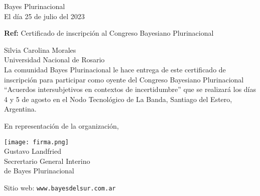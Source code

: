 \documentclass[a4paper,11pt]{letter}
\begin{document}
\begin{letter}{\phantom{.}}


\begin{flushright}
Bayes Plurinacional \\
El día 25 de julio del 2023
\end{flushright}

\vspace{1cm}
\noindent

\hfill \textbf{Ref:} Certificado de inscripción al Congreso Bayesiano Plurinacional\\

\vspace{1cm}

\noindent Silvia Carolina Morales \\
Universidad Nacional de Rosario \\ [0.3cm]

\hspace{1cm} La comunidad Bayes Plurinacional le hace entrega de  este certificado de inscripción para participar como oyente del Congreso Bayesiano Plurinacional ``Acuerdos intersubjetivos en contextos de incertidumbre'' que se realizará los días 4 y 5 de agosto en el Nodo Tecnológico de La Banda, Santiago del Estero, Argentina.

\vspace{0.3cm}

\hspace{1cm} En representación de la organización,


\begin{flushleft}
\hfill \texttt{[image: firma.png]}\hspace{2cm}\phantom{.} \\[0cm]
\hfill Gustavo Landfried \hspace{2.5cm}\phantom{.}\\ \small
\hfill Secrertario General Interino \hspace{2.5cm}\phantom{.}\\
\hfill de Bayes Plurinacional \hspace{2.5cm}\phantom{.}\\
\end{flushleft}



 \vspace{0.8cm}
\small

 Sitio web: \texttt{www.bayesdelsur.com.ar}



 \end{letter}
\end{document}
